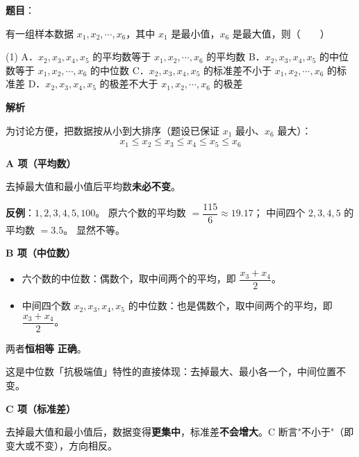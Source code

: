 \begin{answer}

\textbf{题目}：

有一组样本数据 $x_1,x_2,\cdots,x_6$，其中 $x_1$ 是最小值，$x_6$ 是最大值，则\mbox{（　　）}

\begin{gkopts}(1)
\task A．$x_2,x_3,x_4,x_5$ 的平均数等于 $x_1,x_2,\cdots,x_6$ 的平均数
\task B．$x_2,x_3,x_4,x_5$ 的中位数等于 $x_1,x_2,\cdots,x_6$ 的中位数
\task C．$x_2,x_3,x_4,x_5$ 的标准差不小于 $x_1,x_2,\cdots,x_6$ 的标准差
\task D．$x_2,x_3,x_4,x_5$ 的极差不大于 $x_1,x_2,\cdots,x_6$ 的极差
\end{gkopts}

\textbf{解析}

为讨论方便，把数据按从小到大排序（题设已保证 $x_1$ 最小、$x_6$ 最大）：
\nopagebreak[4]
\[x_1\le x_2\le x_3\le x_4\le x_5\le x_6\]

\par\medskip

\textbf{A 项（平均数）}

去掉最大值和最小值后平均数\textbf{未必不变}。

\textbf{反例}：$1,2,3,4,5,100$。
原六个数的平均数 $=\dfrac{115}6\approx19.17$；
中间四个 $2,3,4,5$ 的平均数 $=3.5$。
显然不等。

\par\medskip

\textbf{B 项（中位数）}

\begin{itemize}
\item 六个数的中位数：偶数个，取中间两个的平均，即 $\dfrac{x_3+x_4}2$。
\item 中间四个数 $x_2,x_3,x_4,x_5$ 的中位数：也是偶数个，取中间两个的平均，即 $\dfrac{x_3+x_4}2$。
\end{itemize}

两者\textbf{恒相等}  \textbf{正确}。

\begin{gktip}
这是中位数「抗极端值」特性的直接体现：去掉最大、最小各一个，中间位置不变。
\end{gktip}

\par\medskip

\textbf{C 项（标准差）}

去掉最大值和最小值后，数据变得\textbf{更集中}，标准差\textbf{不会增大}。C 断言"不小于"（即变大或不变），方向相反。


\end{answer}
